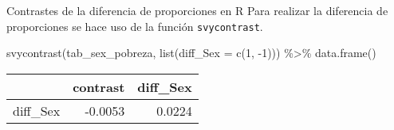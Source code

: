 \documentclass[
  ignorenonframetext,
]{beamer}
\newenvironment{Shaded}{\begin{snugshade}}{\end{snugshade}}
\newcommand{\AttributeTok}[1]{\textcolor[rgb]{0.77,0.63,0.00}{#1}}
\newcommand{\DecValTok}[1]{\textcolor[rgb]{0.00,0.00,0.81}{#1}}
\newcommand{\FunctionTok}[1]{\textcolor[rgb]{0.00,0.00,0.00}{#1}}
\newcommand{\NormalTok}[1]{#1}
\newcommand{\SpecialCharTok}[1]{\textcolor[rgb]{0.00,0.00,0.00}{#1}}
\begin{document}
\begin{frame}[fragile]{Contrastes de la diferencia de proporciones en R}
\protect\hypertarget{contrastes-de-la-diferencia-de-proporciones-en-r}{}
Para realizar la diferencia de proporciones se hace uso de la función
\texttt{svycontrast}.

\begin{Shaded}
\begin{Highlighting}[]
\FunctionTok{svycontrast}\NormalTok{(tab\_sex\_pobreza,}
            \FunctionTok{list}\NormalTok{(}\AttributeTok{diff\_Sex =} \FunctionTok{c}\NormalTok{(}\DecValTok{1}\NormalTok{, }\SpecialCharTok{{-}}\DecValTok{1}\NormalTok{))) }\SpecialCharTok{\%\textgreater{}\%}
  \FunctionTok{data.frame}\NormalTok{()}
\end{Highlighting}
\end{Shaded}

\begin{tabular}{l|r|r}
\hline
  & contrast & diff\_Sex\\
\hline
diff\_Sex & -0.0053 & 0.0224\\
\hline
\end{tabular}
\end{frame}
\end{document}

